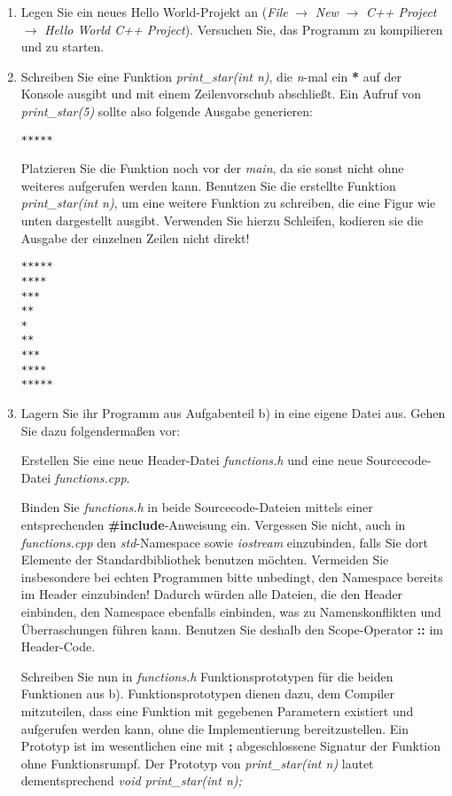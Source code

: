\documentclass[
  accentcolor=tud1c,	%
  colorbacktitle,		%
  inverttitle,			%
  german,				%
  twoside
]{tudexercise}
\begin{document}
\begin{enumerate}

\item Legen Sie ein neues \glqq{}Hello World\grqq{}-Projekt an (\textit{File} $\rightarrow$ \textit{New} $\rightarrow$ \textit{C++ Project} $\rightarrow$ \textit{Hello World C++ Project}). Versuchen Sie, das Programm zu kompilieren und zu starten.


\item 
Schreiben Sie eine Funktion \emph{print\_star(int n)}, die \emph{n}-mal ein \textbf{*} auf der Konsole ausgibt und mit einem Zeilenvorschub abschließt. Ein Aufruf von \emph{print\_star(5)} sollte also folgende Ausgabe generieren:
\begin{lstlisting}
*****
\end{lstlisting}

Platzieren Sie die Funktion noch vor der \emph{main}, da sie sonst nicht ohne weiteres aufgerufen werden kann. Benutzen Sie die erstellte Funktion \emph{print\_star(int n)}, um eine weitere Funktion zu schreiben, die eine Figur wie unten dargestellt ausgibt. Verwenden Sie hierzu Schleifen, kodieren sie die Ausgabe der einzelnen Zeilen nicht direkt! 
\begin{lstlisting}
*****
****
***
**
*
**
***
****
*****
\end{lstlisting}

\item
Lagern Sie ihr Programm aus Aufgabenteil b) in eine eigene Datei aus. Gehen Sie dazu
folgendermaßen vor: 

Erstellen Sie eine neue Header-Datei \emph{functions.h} und eine neue Sourcecode-Datei \emph{functions.cpp}. 

Binden Sie \emph{functions.h} in beide Sourcecode-Dateien mittels 
einer entsprechenden \textbf{\#include}-Anweisung ein. Vergessen Sie nicht, auch in \emph{functions.cpp} den \emph{std}-Namespace sowie \emph{iostream} einzubinden, falls Sie dort Elemente der Standardbibliothek benutzen möchten. Vermeiden Sie insbesondere bei echten Programmen bitte unbedingt, den Namespace bereits im Header einzubinden! Dadurch würden alle Dateien, die den Header einbinden, den Namespace ebenfalls einbinden, was zu Namenskonflikten und Überraschungen führen kann. Benutzen Sie deshalb den Scope-Operator \textbf{::} im Header-Code.

Schreiben Sie nun in \emph{functions.h} Funktionsprototypen für die beiden Funktionen aus b). Funktionsprototypen dienen dazu, dem Compiler mitzuteilen, dass eine Funktion mit gegebenen Parametern existiert und aufgerufen werden kann, ohne die Implementierung bereitzustellen. Ein Prototyp ist im wesentlichen eine mit \textbf{;} abgeschlossene Signatur der Funktion ohne Funktionsrumpf. Der Prototyp von \emph{print\_star(int n)} lautet dementsprechend \emph{void print\_star(int n);}


\end{enumerate}
\end{document}
